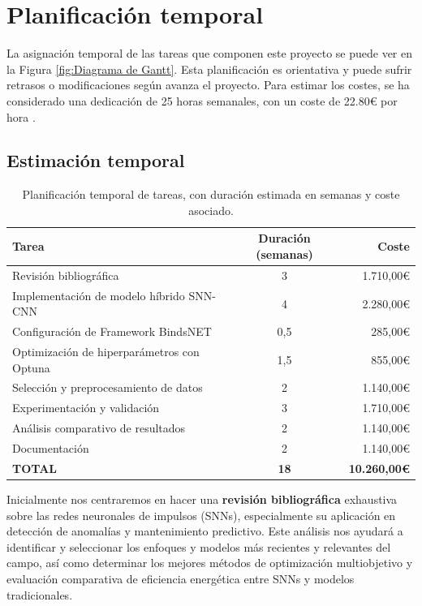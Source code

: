 \section{Planificación temporal}

La asignación temporal de las tareas que componen este proyecto se puede ver en la Figura \ref{fig:Diagrama de Gantt}. Esta planificación es orientativa y puede sufrir retrasos o modificaciones según avanza el proyecto. Para estimar los costes, se ha considerado una dedicación de 25 horas semanales, con un coste de 22.80€ por hora \cite{Talent.com_2024}.

\subsection{Estimación temporal}

\begin{table}[htbp]
\centering
\begin{tabular}{lcr}
\hline \hline
\textbf{Tarea} & \textbf{Duración (semanas)} & \textbf{Coste} \\
\hline
Revisión bibliográfica & 3 & 1.710,00€ \\
Implementación de modelo híbrido SNN-CNN & 4 & 2.280,00€ \\
Configuración de Framework BindsNET & 0,5 & 285,00€ \\
Optimización de hiperparámetros con Optuna & 1,5 & 855,00€ \\
Selección y preprocesamiento de datos & 2 & 1.140,00€ \\
Experimentación y validación & 3 & 1.710,00€ \\
Análisis comparativo de resultados & 2 & 1.140,00€ \\
Documentación  & 2 & 1.140,00€ \\
\hline
\textbf{TOTAL} & \textbf{18} & \textbf{10.260,00€} \\
\hline \hline
\end{tabular}
\caption{Planificación temporal de tareas, con duración estimada en semanas y coste asociado.}
\label{tab:planificacion_tareas}
\end{table}

Inicialmente nos centraremos en hacer una \textbf{revisión bibliográfica} exhaustiva sobre las redes neuronales de impulsos (SNNs), especialmente su aplicación en detección de anomalías y mantenimiento predictivo. Este análisis nos ayudará a identificar y seleccionar los enfoques y modelos más recientes y relevantes del campo, así como determinar los mejores métodos de optimización multiobjetivo y evaluación comparativa de eficiencia energética entre SNNs y modelos tradicionales.

